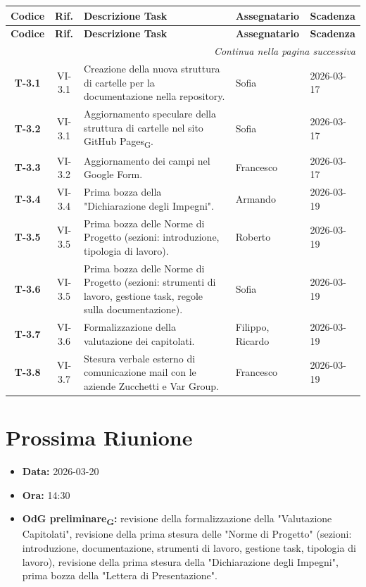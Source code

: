\begin{longtable}{c c p{4.5cm} l l}
    \toprule
    \textbf{Codice} & \textbf{Rif.} & \textbf{Descrizione Task} & \textbf{Assegnatario} & \textbf{Scadenza} \\
    \midrule
    \endfirsthead

    \toprule
    \textbf{Codice} & \textbf{Rif.} & \textbf{Descrizione Task} & \textbf{Assegnatario} & \textbf{Scadenza} \\
    \midrule
    \endhead

    \midrule
    \multicolumn{5}{r}{\textit{Continua nella pagina successiva}} \\
    \midrule
    \endfoot

    \bottomrule
    \endlastfoot

    \textbf{T-3.1} & VI-3.1 & Creazione della nuova struttura di cartelle per la documentazione nella repository. & Sofia & 2026-03-17 \\
    \textbf{T-3.2} & VI-3.1 & Aggiornamento speculare della struttura di cartelle nel sito GitHub Pages\textsubscript{G}. & Sofia & 2026-03-17 \\
    \textbf{T-3.3} & VI-3.2 & Aggiornamento dei campi nel Google Form. & Francesco & 2026-03-17 \\
    \textbf{T-3.4} & VI-3.4 & Prima bozza della "Dichiarazione degli Impegni". & Armando & 2026-03-19 \\
    \textbf{T-3.5} & VI-3.5 & Prima bozza delle Norme di Progetto (sezioni: introduzione, tipologia di lavoro). & Roberto & 2026-03-19 \\
    \textbf{T-3.6} & VI-3.5 & Prima bozza delle Norme di Progetto (sezioni: strumenti di lavoro, gestione task, regole sulla documentazione). & Sofia & 2026-03-19 \\
    \textbf{T-3.7} & VI-3.6 & Formalizzazione della valutazione dei capitolati. & Filippo, Ricardo & 2026-03-19 \\
    \textbf{T-3.8} & VI-3.7 & Stesura verbale esterno di comunicazione mail con le aziende Zucchetti e Var Group. & Francesco & 2026-03-19 \\
\end{longtable}

\section{Prossima Riunione}
\begin{itemize}
    \item \textbf{Data:} 2026-03-20
    \item \textbf{Ora:} 14:30
    \item \textbf{OdG preliminare\textsubscript{G}:} revisione della formalizzazione della "Valutazione Capitolati", revisione della prima stesura delle "Norme di Progetto" (sezioni: introduzione, documentazione, strumenti di lavoro, gestione task, tipologia di lavoro), revisione della prima stesura della "Dichiarazione degli Impegni",  prima bozza della "Lettera di Presentazione".
\end{itemize}
